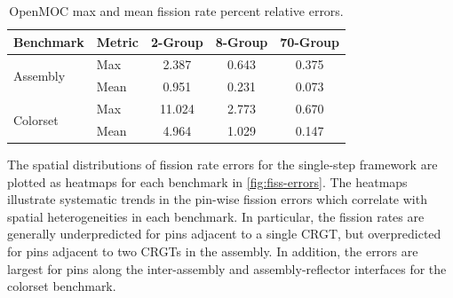 \begin{table}[h!]
  \centering
  \caption{OpenMOC max and mean fission rate percent relative errors.}
  \label{tab:fiss-errors}
  \begin{tabular}{l l c c c}
  \toprule
  \textbf{Benchmark} & \textbf{Metric} & \textbf{2-Group} & \textbf{8-Group} & \textbf{70-Group} \\
  \midrule
  \multirow{2}{*}{Assembly} & Max  & 2.387 & 0.643 & 0.375 \\
                            & Mean & 0.951 & 0.231 & 0.073 \\
  \midrule
  \multirow{2}{*}{Colorset} & Max  & 11.024 & 2.773 & 0.670 \\
                            & Mean & 4.964  & 1.029 & 0.147 \\
  \bottomrule
\end{tabular}
\end{table}

The spatial distributions of fission rate errors for the single-step framework are plotted as heatmaps for each benchmark in \autoref{fig:fiss-errors}. The heatmaps illustrate systematic trends in the pin-wise fission errors which correlate with spatial heterogeneities in each benchmark. In particular, the fission rates are generally underpredicted for pins adjacent to a single CRGT, but overpredicted for pins adjacent to two CRGTs in the assembly. In addition, the errors are largest for pins along the inter-assembly and assembly-reflector interfaces for the colorset benchmark.


